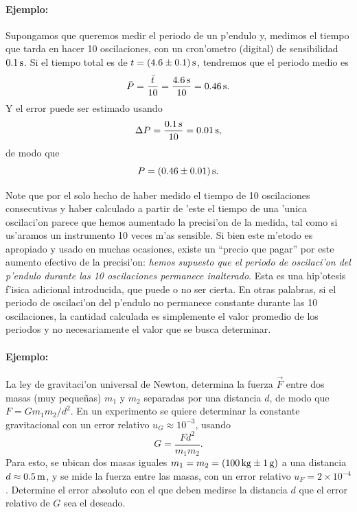 \documentclass[letterpaper,11pt]{report}
\begin{document}
\paragraph{Ejemplo:}
Supongamos que queremos medir el periodo de un p'endulo y, medimos el tiempo que tarda en hacer 10 oscilaciones, con un cron'ometro (digital) de sensibilidad $0.1\,\rm s$. Si el tiempo total es de $t=(4.6\pm 0.1)\,\rm s$, tendremos que el periodo medio es 
\begin{equation}
\bar{P} = \frac{\bar{t}}{10}=\frac{4.6\,\rm s}{10}=0.46{\,\rm s}.
\end{equation}
Y el error puede ser estimado usando
\begin{equation}
\Delta P = \frac{0.1\,\rm s}{10}=0.01{\,\rm s},
\end{equation}
de modo que
\begin{equation}
P=(0.46\pm 0.01){\,\rm s}.
\end{equation}

Note que por el solo hecho de haber medido el tiempo de 10 oscilaciones consecutivas y haber calculado a partir de 'este el tiempo de una 'unica oscilaci'on parece que hemos aumentado la precisi'on de la medida, tal como si us'aramos un instrumento 10 veces m'as sensible. Si bien este m'etodo es apropiado y usado en muchas ocasiones, existe un ``precio que pagar'' por este aumento efectivo de la precisi'on: \textit{hemos supuesto que el periodo de oscilaci'on del p'endulo durante las 10 oscilaciones permanece inalterado}. Esta es una hip'otesis f'isica adicional introducida, que puede o no ser cierta. En otras palabras, si el periodo de oscilaci'on del p'endulo no permanece constante durante las 10 oscilaciones, la cantidad calculada es simplemente el valor promedio de los periodos y no necesariamente el valor que se busca determinar.

\paragraph{Ejemplo:}
La ley de gravitaci'on universal de Newton, determina la fuerza $\vec{F}$ entre dos masas (muy peque\~nas) $m_1$ y $m_2$ separadas por una distancia $d$, de modo que $
F=G{m_1m_2}/{d^2}$. En un experimento se quiere determinar la constante gravitacional con un error relativo $u_G\approx 10^{-3}$, usando 
\begin{equation}
G=\frac{Fd^2}{m_1m_2}.
\end{equation}
Para esto, se ubican dos masas iguales $m_1=m_2=(100{\,\rm kg}\pm 1{\,\rm g})$ a una distancia $d\approx 0.5{\, \rm m}$, y se mide la fuerza entre las masas, con un error relativo $u_F=2\times 10^{-4}$. Determine el error absoluto con el que deben medirse la distancia $d$ que el error relativo de $G$ sea el deseado.
\end{document}
